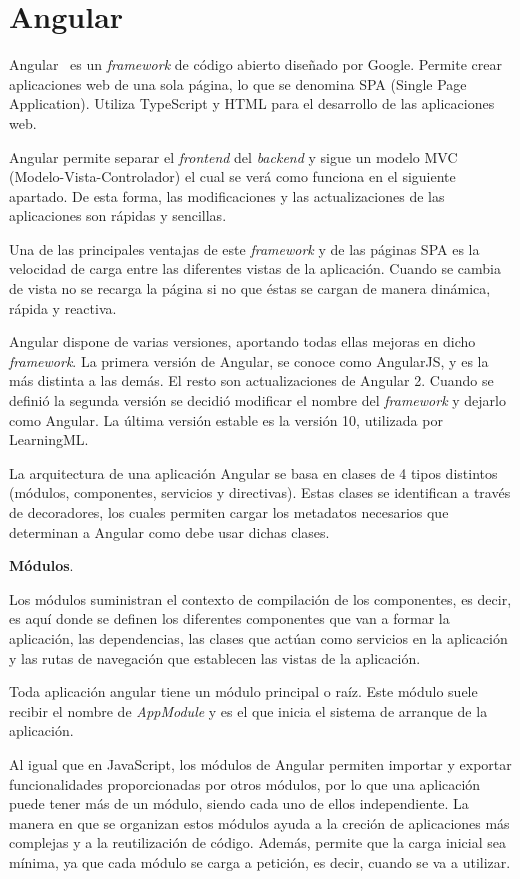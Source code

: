 \documentclass[a4paper, 12pt]{book}
\begin{document}
\section{Angular} 
\label{sec:angular}

Angular~\cite{angular} es un \emph{framework} de código abierto diseñado por Google. Permite crear aplicaciones web de una sola página, lo que se denomina SPA (Single Page Application). Utiliza TypeScript y HTML para el desarrollo de las aplicaciones web. 

Angular permite separar el \emph{frontend} del \emph{backend} y sigue un modelo MVC (Modelo-Vista-Controlador) el cual se verá como funciona en el siguiente apartado. De esta forma, las modificaciones y las actualizaciones de las aplicaciones son rápidas y sencillas. 

Una de las principales ventajas de este \emph{framework} y de las páginas SPA es la velocidad de carga entre las diferentes vistas de la aplicación. Cuando se cambia de vista no se recarga la página si no que éstas se cargan de manera dinámica, rápida y reactiva. 

Angular dispone de varias versiones, aportando todas ellas mejoras en dicho \emph{framework}. La primera versión de Angular, se conoce como AngularJS, y es la más distinta a las demás. El resto son actualizaciones de Angular 2. Cuando se definió la segunda versión se decidió modificar el nombre del \emph{framework} y dejarlo como Angular. La última versión estable es la versión 10, utilizada por LearningML.

La arquitectura de una aplicación Angular se basa en clases de 4 tipos distintos (módulos, componentes, servicios y directivas). Estas clases se identifican a través de decoradores, los cuales permiten cargar los metadatos necesarios que determinan a Angular como debe usar dichas clases.

\textbf{Módulos}.

Los módulos suministran el contexto de compilación de los componentes, es decir, es aquí donde se definen los diferentes componentes que van a formar la aplicación, las dependencias, las clases que actúan como servicios en la aplicación y las rutas de navegación que establecen las vistas de la aplicación. 

Toda aplicación angular tiene un módulo principal o raíz. Este módulo suele recibir el nombre de \emph{AppModule} y es el que inicia el sistema de arranque de la aplicación.

Al igual que en JavaScript, los módulos de Angular permiten importar y exportar funcionalidades proporcionadas por otros módulos, por lo que una aplicación puede tener más de un módulo, siendo cada uno de ellos independiente. La manera en que se organizan estos módulos ayuda a la creción de aplicaciones más complejas y a la reutilización de código. Además, permite que la carga inicial sea mínima, ya que cada módulo se carga a petición, es decir, cuando se va a utilizar. 
\end{document}
